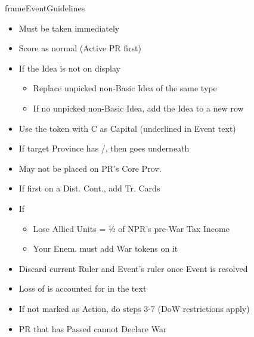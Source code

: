 \documentclass[10pt]{article}
\newlength{\fhEventGuidelines} \setlength\fhEventGuidelines{34\baselineskip}
\begin{document}
\begin{dynamiccontents*}{frameEventGuidelines}
\begin{eubox}{\fhEventGuidelines}
\begin{multicols*}{2}
\begin{itemize}
		\end{itemize}
		\begin{itemize}
			\item Must be taken immediately
		\end{itemize}
		\begin{itemize}
			\item Score \prestige as normal (Active PR first)
			\item If the Idea is not on display
			\begin{itemize}
				\item Replace unpicked non-Basic Idea of the same type
				\item If no unpicked non-Basic Idea, add the Idea to a new row
			\end{itemize}
		\end{itemize}
		\begin{itemize}
			\item Use the token with C as Capital (underlined in Event text)
			\item If target Province has \town/\vassal, then \dnpr goes underneath
			\item May not be placed on PR's Core Prov.
			\item If first \dnpr on a Dist. Cont., add Tr. Cards
		\end{itemize}
		\begin{itemize}
			\item If \activeally
			\begin{itemize}
				\item Lose Allied Units = ½ of NPR's pre-War Tax Income
				\item Your Enem. must add War tokens on it
			\end{itemize}
		\end{itemize}
		\begin{itemize}
			\item Discard current Ruler and Event's ruler once Event is resolved
		\end{itemize}
		\begin{itemize}
			\item Loss of \authority is accounted for in the text
		\end{itemize}
		\begin{itemize}
			\item If not marked as  Action, do steps 3-7 (DoW restrictions apply)
			\item PR that has Passed cannot Declare War
		\end{itemize}
	\end{multicols*}
\end{eubox}\end{dynamiccontents*}
\end{document}
